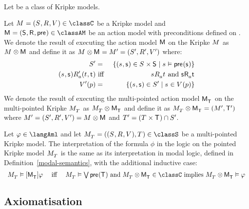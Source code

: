\begin{definition}
Let \classC{} be a class of Kripke models.

Let $\modelAndTuple \in \classC$ be a Kripke model and $\actionModelAndTuple \in \classAM$ be an action model with preconditions defined on \langAml{}.
We denote the result of executing the action model $\actionModel$ on the Kripke $\model$ as $\model \exec \actionModel$ and define it as $\model \exec \actionModel = \modelAndTuple[\prime]$ where:
\begin{eqnarray*}
    \states[\prime] &=& \{(\stateS, \actionStateS) \in \states \times \actionStates \mid \stateS \entails \actionPrecondition(\actionStateS)\}\\
    (\stateS, \actionStateS) \accessibility[\prime]{\agentA} (\stateT, \actionStateT) &\text{ iff }& \stateS \accessibility{\agentA} \stateT \text{ and } \actionStateS \actionAccessibility{\agentA} \actionStateT\\
    \valuation[\prime](\atomP) &=& \{(\stateS, \actionStateS) \in \states[\prime] \mid \stateS \in \valuation(\atomP)\}
\end{eqnarray*}
We denote the result of executing the multi-pointed action model $\pointedActionModel{\actionStatesT}$ on the multi-pointed Kripke $\pointedModel{\statesT}$ as $\pointedModel{\statesT} \exec \pointedActionModel{\actionStatesT}$ and define it as $\pointedModel{\statesT} \exec \pointedActionModel{\actionStatesT} = (\model[\prime], \actionStatesT[\prime])$ where $\modelAndTuple[\prime] = \model \exec \actionModel$ and $\statesT[\prime] = (\statesT \times \actionStatesT) \cap \states[\prime]$.

Let $\phi \in \langAml$ and let $\pointedModelAndTuple{\statesT} \in \classS$ be a multi-pointed Kripke model.
The interpretation of the formula $\phi$ in the logic \logicAmlS{} on the pointed Kripke model $\pointedModel{\statesT}$ is the same as its interpretation in modal logic, defined in Definition~\ref{modal-semantics}, with the additional inductive case:
$$
\begin{array}{lcl}
    \pointedModel{\statesT} \entails \actionA{\pointedActionModel{\actionStatesT}} \phi & \text { iff } & \pointedModel{\statesT} \entails \bigvee \actionPrecondition(\actionStatesT) \text{ and } \pointedModel{\statesT} \exec \pointedActionModel{\actionStatesT} \in \classC \text{ implies } \pointedModel{\statesT} \exec \pointedActionModel{\actionStatesT} \entails \phi
\end{array}
$$
\end{definition}

\subsection{Axiomatisation}
